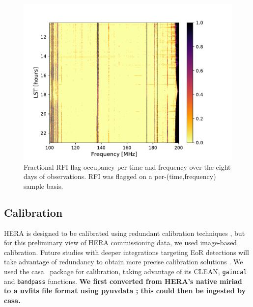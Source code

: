\documentclass[twocolumn, trackchanges]{aastex61}
\newcommand{\casa}{{\sc casa}}
\newcommand{\edited}[1]{{\bf \color{red} #1}}
\begin{document}
\begin{figure}
\centering
\includegraphics[scale=0.6]{frac_occ.pdf}
\caption{Fractional RFI flag occupancy per time and frequency over the eight days of observations. RFI was flagged on a per-(time,frequency) sample basis.}
\label{fig:rfi}
\end{figure}

\subsection{Calibration}
\label{subsec:cal}

HERA is designed to be calibrated using redundant calibration techniques \citep{DillonParsons16}, but for this preliminary view of HERA commissioning data, we used image-based calibration. Future studies with deeper integrations targeting EoR detections will take advantage of redundancy to obtain more precise calibration solutions \citep{deBoer17}. We used the \casa\ \citep{casa} package for calibration, taking advantage of its CLEAN, {\tt gaincal} and {\tt bandpass} functions.  \edited{We first converted from HERA's native {\sc miriad} to a {\sc uvfits} file format using {\sc pyuvdata} \citep{pyuvdata}; this could then be ingested by \casa.}
\end{document}
